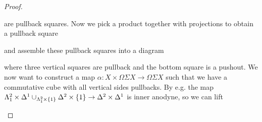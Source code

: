 \begin{lemma}
\begin{proof}
\begin{center}
        \end{center}
        are pullback squares.
        Now we pick a product together with projections to obtain a pullback square 
        \begin{center}
        \end{center}
        and assemble these pullback squares into a diagram
        \begin{center}
        \end{center}
        where three vertical squares are pullback and the bottom square is a pushout.
        We now want to construct a map $\alpha\colon X\times\Omega\Sigma X\to\Omega\Sigma X$ such that we have a commutative cube with all vertical sides pullbacks.
        By e.g. \cite[Lemma 1.4.7.5]{kerodon} the map $\Lambda_1^2\times\Delta^1\cup_{\Lambda_1^2\times\left\lbrace1\right\rbrace}\Delta^2\times\left\lbrace1
        \right\rbrace\to\Delta^2\times\Delta^1$ is inner anodyne, so we can lift
        \begin{center}
\end{center}
\end{proof}
\end{lemma}
